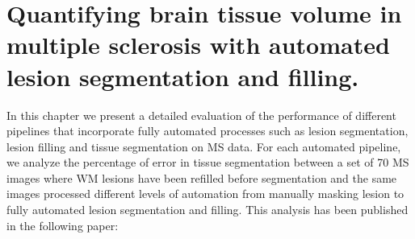 
\chapter{Quantifying brain tissue volume in multiple sclerosis with automated lesion segmentation and filling.}  

\label{chapter:chapter_5}

 In this chapter we present a detailed evaluation of the performance of different pipelines that incorporate fully automated processes such as lesion segmentation, lesion filling and tissue segmentation on MS data. For each automated pipeline, we analyze the percentage of error in tissue segmentation between a set of 70 MS images where WM lesions have been refilled before segmentation and the same images processed different levels of automation from manually masking lesion to fully automated lesion segmentation and filling. This analysis has been published in the following paper:

\vspace{2cm}

\noindent{}
%




